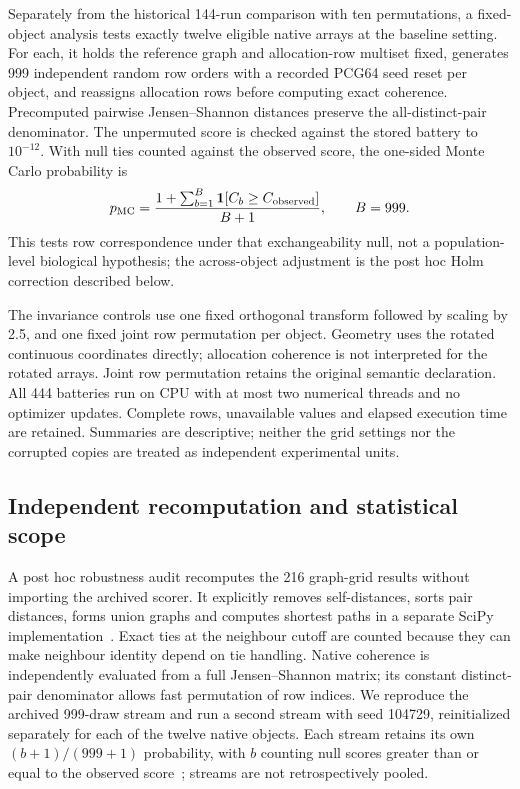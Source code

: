 \documentclass[11pt]{article}
\begin{document}
Separately from the historical 144-run comparison with ten permutations, a fixed-object analysis tests exactly twelve eligible native arrays at the baseline setting. For each, it holds the reference graph and allocation-row multiset fixed, generates 999 independent random row orders with a recorded PCG64 seed reset per object, and reassigns allocation rows before computing exact coherence. Precomputed pairwise Jensen--Shannon distances preserve the all-distinct-pair denominator. The unpermuted score is checked against the stored battery to $10^{-12}$. With null ties counted against the observed score, the one-sided Monte Carlo probability is
\begin{equation}
 p_{\rm MC}=\frac{1+\sum_{b=1}^{B}\mathbf 1[C_b\geq C_{\rm observed}]}{B+1},\qquad B=999.
\end{equation}
This tests row correspondence under that exchangeability null, not a population-level biological hypothesis; the across-object adjustment is the post hoc Holm correction described below.

The invariance controls use one fixed orthogonal transform followed by scaling by 2.5, and one fixed joint row permutation per object. Geometry uses the rotated continuous coordinates directly; allocation coherence is not interpreted for the rotated arrays. Joint row permutation retains the original semantic declaration. All 444 batteries run on CPU with at most two numerical threads and no optimizer updates. Complete rows, unavailable values and elapsed execution time are retained. Summaries are descriptive; neither the grid settings nor the corrupted copies are treated as independent experimental units.

\subsection{Independent recomputation and statistical scope}

A post hoc robustness audit recomputes the 216 graph-grid results without importing the archived scorer. It explicitly removes self-distances, sorts pair distances, forms union graphs and computes shortest paths in a separate SciPy implementation~\cite{virtanen2020scipy}. Exact ties at the neighbour cutoff are counted because they can make neighbour identity depend on tie handling. Native coherence is independently evaluated from a full Jensen--Shannon matrix; its constant distinct-pair denominator allows fast permutation of row indices. We reproduce the archived 999-draw stream and run a second stream with seed 104729, reinitialized separately for each of the twelve native objects. Each stream retains its own $(b+1)/(999+1)$ probability, with $b$ counting null scores greater than or equal to the observed score~\cite{phipson2010permutation}; streams are not retrospectively pooled.
\end{document}
